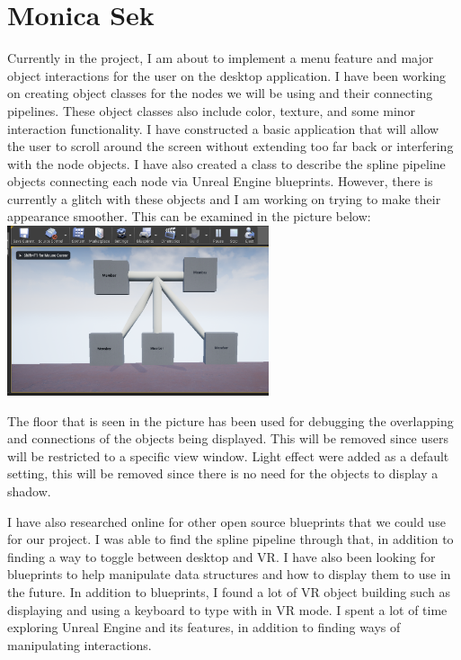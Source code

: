 \documentclass[onecolumn, draftclsnofoot, 10pt, compsoc]{IEEEtran}
\begin{document}
\section{Monica Sek}
\begin{singlespace}
Currently in the project, I am about to implement a menu feature and major object interactions for the user on the desktop application. I have been working on creating object classes for the nodes we will be using and their connecting pipelines. These object classes also include color, texture, and some minor interaction functionality. I have constructed a basic application that will allow the user to scroll around the screen without extending too far back or interfering with the node objects. I have also created a class to describe the spline pipeline objects connecting each node via Unreal Engine blueprints. However, there is currently a glitch with these objects and I am working on trying to make their appearance smoother. This can be examined in the picture below:\\
\newline
\includegraphics[height=5cm]{tree}
\newline

The floor that is seen in the picture has been used for debugging the overlapping and connections of the objects being displayed. This will be removed since users will be restricted to a specific view window. Light effect were added as a default setting, this will be removed since there is no need for the objects to display a shadow. 

I have also researched online for other open source blueprints that we could use for our project. I was able to find the spline pipeline through that, in addition to finding a way to toggle between desktop and VR. I have also been looking for blueprints to help manipulate data structures and how to display them to use in the future. In addition to blueprints, I found a lot of VR object building such as displaying and using a keyboard to type with in VR mode. I spent a lot of time exploring Unreal Engine and its features, in addition to finding ways of manipulating interactions. 


\end{singlespace}
\end{document}
